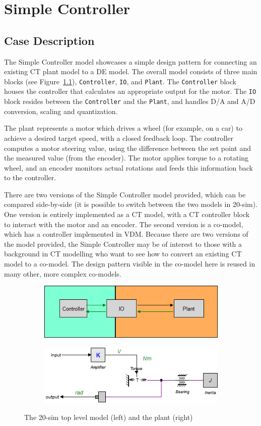 \chapter{Simple Controller} \label{chap:controllerPattern}
\section{Case Description}

The Simple Controller model showcases a simple design pattern for
connecting an existing CT plant model to a DE model. 
The overall model consists of three main blocks (see Figure~\ref{fig:20simmotor}),
\texttt{Controller}, \texttt{IO}, and \texttt{Plant}. The
\texttt{Controller} block houses the controller that calculates an
appropriate output for the motor. The \texttt{IO} block
resides between the \texttt{Controller} and the \texttt{Plant}, and
handles D/A and A/D conversion, scaling and quantization.

The plant represents a motor which drives a wheel (for example,
on a car) to achieve a desired target speed, with a closed feedback
loop. The controller computes a motor steering value, using the difference between the set point and the measured value (from the encoder). 
The motor applies torque to a rotating wheel, and an encoder monitors actual rotations and feeds this information back to the controller.  

There are two versions of the Simple Controller model provided, which can be
compared side-by-side (it is possible to switch between the two models
in 20-sim).  One version is entirely implemented as a CT model, with a
CT controller block to interact with the motor and an encoder.  
The second version is a \DESTECS co-model, which has a controller
implemented in VDM.  Because there are two versions of the model
provided, the Simple Controller may be of interest to those with a
background in CT modelling who want to see how to convert an existing
CT model to a \DESTECS co-model. The design pattern visible in the
co-model here is reused in many other, more complex \DESTECS co-models.

\begin{figure}[!ht]
\begin{subfigure}
\centering
\includegraphics[width=0.5\linewidth]{controllerPattern/toplevel}
\end{subfigure}
\begin{subfigure}
\centering
\includegraphics[width=0.45\linewidth]{controllerPattern/plant}
\end{subfigure}
\caption{The 20-sim top level model (left) and the plant (right)}
\label{fig:20simmotor}
\end{figure}


